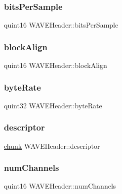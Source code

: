 \subsubsection{\texorpdfstring{bits\+Per\+Sample}{bitsPerSample}}
{\footnotesize\ttfamily quint16 W\+A\+V\+E\+Header\+::bits\+Per\+Sample}

\hypertarget{struct_w_a_v_e_header_a9c53314461e82fa197f69dd44ba1eacc}{}\label{struct_w_a_v_e_header_a9c53314461e82fa197f69dd44ba1eacc} 
\subsubsection{\texorpdfstring{block\+Align}{blockAlign}}
{\footnotesize\ttfamily quint16 W\+A\+V\+E\+Header\+::block\+Align}

\hypertarget{struct_w_a_v_e_header_aa0db8c5f2933a00865fabab8d1faa014}{}\label{struct_w_a_v_e_header_aa0db8c5f2933a00865fabab8d1faa014} 
\subsubsection{\texorpdfstring{byte\+Rate}{byteRate}}
{\footnotesize\ttfamily quint32 W\+A\+V\+E\+Header\+::byte\+Rate}

\hypertarget{struct_w_a_v_e_header_a763f44cebee2065d899d5997e9b22e60}{}\label{struct_w_a_v_e_header_a763f44cebee2065d899d5997e9b22e60} 
\subsubsection{\texorpdfstring{descriptor}{descriptor}}
{\footnotesize\ttfamily \hyperlink{structchunk}{chunk} W\+A\+V\+E\+Header\+::descriptor}

\hypertarget{struct_w_a_v_e_header_a547399f45cc973c818b62fe5410cdd04}{}\label{struct_w_a_v_e_header_a547399f45cc973c818b62fe5410cdd04} 
\subsubsection{\texorpdfstring{num\+Channels}{numChannels}}
{\footnotesize\ttfamily quint16 W\+A\+V\+E\+Header\+::num\+Channels}

